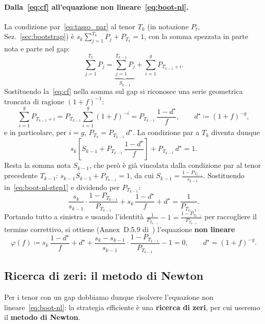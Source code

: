 \documentclass[11pt,a4paper]{article}
\theoremstyle{plain}
\theoremstyle{definition}
\theoremstyle{remark}
\newcommand{\defeq}{\coloneqq}
\begin{document}
\paragraph{Dalla~\eqref{eq:cf} all'equazione non lineare~\eqref{eq:boot-nl}.}
La condizione par~\eqref{eq:tasso_par} al tenor $T_k$ (in notazione $P_t$,
Sez.~\ref{sec:bootstrap}) \`e $s_k\sum_{j=1}^{T_k} P_j + P_{T_k} = 1$, con la somma spezzata
in parte nota e parte nel gap:
\[
  \sum_{j=1}^{T_k} P_j = \underbrace{\sum_{j=1}^{T_{k-1}} P_j}_{S_{k-1}} + \sum_{i=1}^{g} P_{T_{k-1}+i}.
\]
Sostituendo la~\eqref{eq:cf} nella somma sul gap si riconosce una serie geometrica troncata di
ragione $(1+f)^{-1}$:
\[
  \sum_{i=1}^{g} P_{T_{k-1}+i}
  = P_{T_{k-1}} \sum_{i=1}^{g} (1+f)^{-i}
  = P_{T_{k-1}}\,\frac{1-d^\star}{f},
  \qquad d^\star \defeq (1+f)^{-g},
\]
e in particolare, per $i=g$, $P_{T_k}=P_{T_{k-1}}\,d^\star$. La condizione par a $T_k$
diventa dunque
\begin{equation}
  \label{eq:boot-nl-step1}
  s_k\left[S_{k-1} + P_{T_{k-1}}\,\frac{1-d^\star}{f}\right] + P_{T_{k-1}}\,d^\star = 1.
\end{equation}
Resta la somma nota $S_{k-1}$, che per\`o \`e gi\`a vincolata dalla condizione par al tenor
precedente $T_{k-1}$: $s_{k-1}S_{k-1}+P_{T_{k-1}}=1$, da cui
$S_{k-1}=\frac{1-P_{T_{k-1}}}{s_{k-1}}$. Sostituendo in~\eqref{eq:boot-nl-step1} e dividendo
per $P_{T_{k-1}}$:
\[
  \frac{s_k}{s_{k-1}}\cdot\frac{1-P_{T_{k-1}}}{P_{T_{k-1}}}
  + s_k\,\frac{1-d^\star}{f} + d^\star = \frac{1}{P_{T_{k-1}}}.
\]
Portando tutto a sinistra e usando l'identit\`a
$\frac{1}{P_{T_{k-1}}}-1=\frac{1-P_{T_{k-1}}}{P_{T_{k-1}}}$ per raccogliere il termine
correttivo, si ottiene (Annex~D.5.9 di~\cite{eiopa2026}) l'equazione \textbf{non lineare}
\begin{equation}
  \label{eq:boot-nl}
  \varphi(f) \defeq s_{k}\,\frac{1 - d^\star}{f}
            + d^\star
            + \frac{s_{k} - s_{k-1}}{s_{k-1}}\cdot\frac{1 - P_{T_{k-1}}}{P_{T_{k-1}}}
            - 1 = 0,
  \qquad d^\star = (1+f)^{-g}.
\end{equation}

\subsection{Ricerca di zeri: il metodo di Newton}
\label{sec:zeri}

Per i tenor con un gap dobbiamo dunque risolvere l'equazione non lineare~\eqref{eq:boot-nl}: la
strategia efficiente \`e una \textbf{ricerca di zeri}, per cui useremo il \textbf{metodo di
Newton}.
\end{document}
